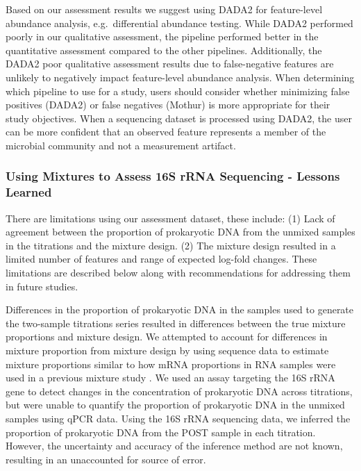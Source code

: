 \documentclass{bmcart}
\begin{document}
Based on our assessment results we suggest using DADA2 for
feature-level abundance analysis, e.g.~differential abundance testing.
While DADA2 performed poorly in our qualitative assessment,
the pipeline performed better in the quantitative assessment compared to the other pipelines.
Additionally, the DADA2 poor qualitative assessment results due to
false-negative features are unlikely to negatively impact feature-level abundance analysis.
When determining which pipeline to use for a study, users should consider
whether minimizing false positives (DADA2) or false negatives (Mothur)
is more appropriate for their study objectives.
When a sequencing dataset is processed using DADA2, the user can be more
confident that an observed feature represents a member of the
microbial community and not a measurement artifact.

\subsubsection*{Using Mixtures to Assess 16S rRNA Sequencing - Lessons Learned}

There are limitations using our assessment dataset, these include:
(1) Lack of agreement between the proportion of prokaryotic DNA from the
unmixed samples in the titrations and the mixture design.
(2) The mixture design resulted in a limited number of features and range of expected log-fold changes.
These limitations are described below along with
recommendations for addressing them in future studies.

Differences in the proportion of prokaryotic DNA in the samples used to
generate the two-sample titrations series resulted in differences
between the true mixture proportions and mixture design. We attempted to
account for differences in mixture proportion from mixture design by
using sequence data to estimate mixture proportions similar to how mRNA
proportions in RNA samples were used in a previous mixture study
\cite{parsons2015using}. We used an assay targeting the 16S rRNA gene
to detect changes in the concentration of prokaryotic DNA across
titrations, but were unable to quantify the proportion of prokaryotic
DNA in the unmixed samples using qPCR data. Using the 16S rRNA sequencing
data, we inferred the proportion of prokaryotic DNA from the POST sample
in each titration. However, the uncertainty and accuracy of the
inference method are not known, resulting in an unaccounted for source of error.
\end{document}
